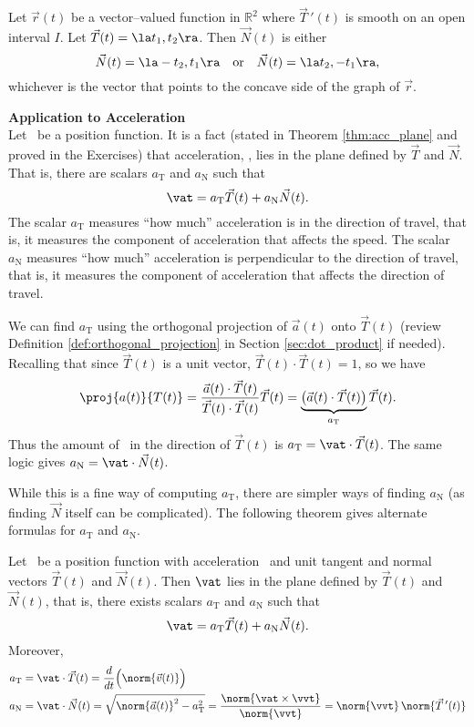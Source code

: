 {Let $\vec r(t)$ be a vector--valued function in $\mathbb{R}^2$ where $\vec T\,'(t)$ is smooth on an open interval $I$. Let $\vec T(t) = \la t_1,t_2\ra$. Then $\vec N(t)$ is either
$$\vec N(t) = \la -t_2,t_1\ra \quad \text{or}\quad \vec N(t) = \la t_2,-t_1\ra,$$ whichever is the vector that points to the concave side of the graph of $\vec r$.
}

\noindent\textbf{\large Application to Acceleration}\\

Let \vrt\ be a position function. It is a fact (stated in Theorem \ref{thm:acc_plane} and proved in the Exercises) that acceleration, \vat, lies in the plane defined by $\vec T$ and $\vec N$. That is, there are scalars $a_{\text{T}}$ and $a_{\text{N}}$ such that 
$$\vat = a_{\text{T}}\vec T(t) + a_{\text{N}}\vec N(t).$$
The scalar $a_{\text{T}}$ measures ``how much'' acceleration is in the direction of travel, that is, it measures the component of acceleration that affects the speed. The scalar $a_{\text{N}}$ measures ``how much'' acceleration is perpendicular to the direction of travel, that is, it measures the component of acceleration that affects the direction of travel.

We can find $a_{\text{T}}$ using the orthogonal projection of $\vec a(t)$ onto $\vec T(t)$ (review Definition \ref{def:orthogonal_projection} in Section \ref{sec:dot_product} if needed).
Recalling that since $\vec T(t)$ is a unit vector, $\vec T(t)\cdot\vec T(t)=1$, so we have 
$$\proj{a(t)}{T(t)} = \frac{\vec a(t)\cdot\vec T(t)}{\vec T(t)\cdot\vec T(t)}\vec T(t) = \underbrace{\big(\vec a(t)\cdot\vec T(t)\big)}_{a_{\text{T}}}\vec T(t).$$
Thus the amount of \vat\ in the direction of $\vec T(t)$ is $a_{\text{T}}=\vat\cdot\vec T(t)$. The same logic gives $a_{\text{N}} = \vat\cdot\vec N(t)$.

While this is a fine way of computing $a_{\text{T}}$, there are simpler ways of finding $a_{\text{N}}$ (as finding $\vec N$ itself can be complicated). The following theorem gives alternate formulas for $a_{\text{T}}$ and $a_{\text{N}}$.

\setboxwidth{20pt}
{Let \vrt\ be a position function with acceleration \vat\ and unit tangent and normal vectors $\vec T(t)$ and $\vec N(t)$. Then $\vat$ lies in the plane defined by $\vec T(t)$ and $\vec N(t)$, that is, there exists scalars $a_\text{T}$ and $a_\text{N}$ such that
$$\vat = a_\text{T}\vec T(t) + a_\text{N}\vec N(t).$$
Moreover,
\begin{align*}
a_\text{T} &= \vat\cdot\vec T(t) = \frac{d}{dt}\Big(\norm{\vec v(t)}\Big) \\
a_\text{N} &= \vat\cdot \vec N(t) = \sqrt{\norm{\vec a(t)}^2-a_\text{T}^2} = \frac{\norm{\vat\times\vvt}}{\norm{\vvt}} = \norm{\vvt}\,\norm{\vec T\,'(t)}
\end{align*}
}
\restoreboxwidth

